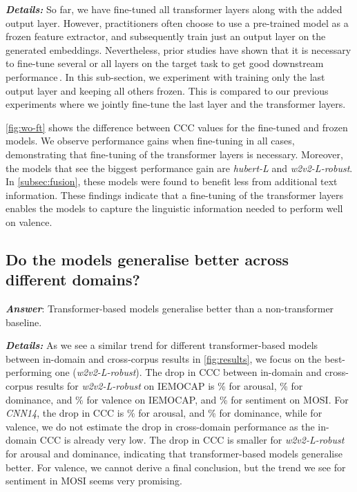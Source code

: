 \documentclass{article}
\newcommand\cnn{\mbox{\emph{CNN14}}}
\newcommand\hlarge{\mbox{\emph{hubert-L}}}
\newcommand\wrobust{\mbox{\emph{w2v2-L-robust}}}
\newcommand\iemocap{\mbox{IEMOCAP}}
\newcommand\mosi{\mbox{MOSI}}
\begin{document}
\noindent
\emph{\textbf{Details:}}
So far, we have fine-tuned all transformer layers along with the added output layer.
However, 
practitioners often choose to use a pre-trained model as a frozen feature extractor,
and subsequently train just an output layer on the generated embeddings.
Nevertheless, prior studies have shown
that it is necessary to fine-tune several or all layers on the target task
to get good downstream performance\,\citep{kong2019panns, wang2021finetuned, liu2020mockingjay, triantafyllopoulos2021role}.
In this sub-section,
we experiment with training only the last output layer and keeping all others frozen.
This is compared to our previous experiments
where we jointly fine-tune the last layer and the transformer layers.

\cref{fig:wo-ft} shows the difference between \ac{CCC} values
for the fine-tuned and frozen models.
We observe performance gains when fine-tuning in all cases,
demonstrating that fine-tuning of the transformer layers is necessary.
Moreover, the models that see the biggest performance gain 
are {\hlarge} and {\wrobust}.
In \cref{subsec:fusion},
these models were found to benefit less from additional text information.
These findings indicate
that a fine-tuning of the transformer layers
enables the models to capture the linguistic information
needed to perform well on valence.




\subsection{Do the models generalise better across different domains?}
\label{subsec:generalisation}

\emph{\textbf{Answer}}:
Transformer-based models generalise better than a non-transformer baseline.

\noindent
\emph{\textbf{Details:}}
As we see a similar trend for different transformer-based models
between in-domain and cross-corpus results in \cref{fig:results},
we focus on the best-performing one ({\wrobust}).
The drop in \ac{CCC} between in-domain and cross-corpus results for {\wrobust} on {\iemocap} is \% for arousal,
\% for dominance,
and \% for valence on IEMOCAP, and \% for sentiment on {\mosi}.
For {\cnn}, the drop in \ac{CCC} is \% for arousal,
and \% for dominance, while for valence,
we do not estimate the drop in cross-domain performance
as the in-domain \ac{CCC} is already very low.
The drop in \ac{CCC} is smaller for {\wrobust} for arousal and dominance,
indicating that transformer-based models generalise better.
For valence, we cannot derive a final conclusion,
but the trend we see for sentiment in {\mosi} seems very promising.
\end{document}
